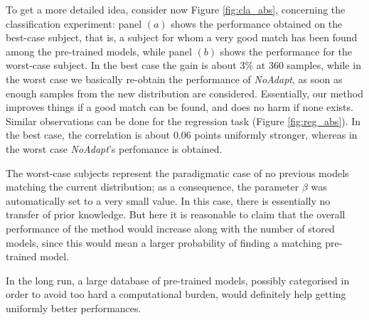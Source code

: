 To get a more detailed idea, consider now Figure \ref{fig:cla_abs},
concerning the classification experiment: panel $(a)$ shows the
performance obtained on the best-case subject, that is, a subject for
whom a very good match has been found among the pre-trained models,
while panel $(b)$ shows the performance for the worst-case subject. In
the best case the gain is about $3\%$ at 360 samples, while
in the worst case we basically re-obtain the performance of
\emph{NoAdapt}, as soon as enough samples from the new distribution
are considered. Essentially, our method improves things if a good
match can be found, and does no harm if none exists.
Similar observations can be done for the regression task (Figure
\ref{fig:reg_abs}). In the best case, the correlation is about
0.06 points uniformly stronger, whereas in the
worst case \emph{NoAdapt}'s perfomance is obtained.

The worst-case subjects represent the paradigmatic case of no previous
models matching the current distribution; as a consequence, the
parameter $\beta$ was automatically set to a very small value. In this
case, there is essentially no transfer of prior knowledge. But here it
is reasonable to claim that the overall performance of the method
would increase along with the number of stored models, since this
would mean a larger probability of finding a matching pre-trained
model.

In the long run, a large database of pre-trained models, possibly
categorised in order to avoid too hard a computational burden, would
definitely help getting uniformly better performances.

